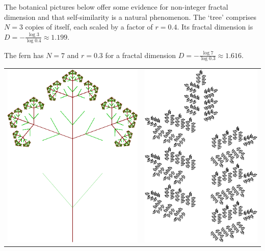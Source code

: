 \begin{example}{}{}
	The botanical pictures below offer some evidence for non-integer fractal dimension and that self-similarity is a natural phenomenon. The `tree' comprises $N=3$ copies of itself, each scaled by a factor of $r=0.4$. Its fractal dimension is $D=-\frac{\log 3}{\log 0.4}\approx 1.199$.\par
	The fern has $N=7$ and $r=0.3$ for a fractal dimension $D=-\frac{\log 7}{\log 0.3}\approx 1.616$.
	\begin{center}
		\begin{tabular}{c@{\qquad\qquad}c}
			\includegraphics{tree2}
			&
			\href{http://www.math.uci.edu/~ndonalds/math161/fern-code.html}{\includegraphics{tree3}}

\end{tabular}
\end{center}
\end{example}
